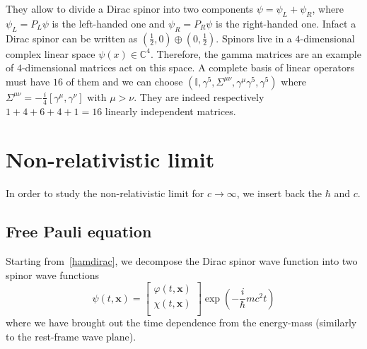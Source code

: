     They allow to divide a Dirac spinor into two components $\psi = \psi_L + \psi_R$, where $\psi_L = P_L \psi$ is the left-handed one and $\psi_R = P_R \psi$ is the right-handed one. Infact a Dirac spinor can be written as $(\frac{1}{2}, 0) \oplus (0, \frac{1}{2})$. Spinors live in a $4$-dimensional complex linear space $\psi(x) \in \mathbb C^4$. Therefore, the gamma matrices are an example of $4$-dimensional matrices act on this space. A complete basis of linear operators must have $16$ of them and we can choose $(\mathbb I, \gamma^5, \Sigma^{\mu\nu}, \gamma^\mu \gamma^5, \gamma^5)$ where $\Sigma^{\mu\nu} = - \frac{i}{4} [\gamma^\mu, \gamma^\nu]$ with $\mu > \nu$. They are indeed respectively $1 + 4 + 6 + 4 + 1 = 16$ linearly independent matrices. 

\chapter{Non-relativistic limit} 

    In order to study the non-relativistic limit for $c \rightarrow \infty$, we insert back the $\hbar$ and $c$. 

\section{Free Pauli equation}
    
    Starting from~\eqref{hamdirac}, we decompose the Dirac spinor wave function into two spinor wave functions 
    \begin{equation}\label{nonrel}
        \psi(t, \mathbf x) = \begin{bmatrix}
            \varphi(t, \mathbf x) \\ \chi (t, \mathbf x) \\
        \end{bmatrix} \exp(- \frac{i}{\hbar} m c^2 t)
    \end{equation}
    where we have brought out the time dependence from the energy-mass (similarly to the rest-frame wave plane).

